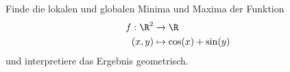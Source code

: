 \begin{prob}
Finde die lokalen und globalen Minima und Maxima der Funktion
\begin{equation*}
        \begin{split}
            f:\R^2&\to\R\\
            (x,y) &\mapsto \cos(x)+\sin(y)
        \end{split}
    \end{equation*}
und interpretiere das Ergebnis geometrisch.
\end{prob}
